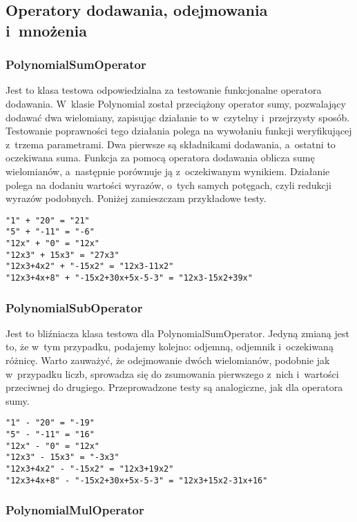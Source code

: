 \subsection{Operatory dodawania, odejmowania i~mnożenia}

\subsubsection{PolynomialSumOperator}

Jest to klasa testowa odpowiedzialna za testowanie funkcjonalne operatora dodawania. W~klasie Polynomial został przeciążony operator sumy, pozwalający dodawać dwa wielomiany, zapisując działanie to w~czytelny i~przejrzysty sposób. Testowanie poprawności tego działania polega na wywołaniu funkcji weryfikującej z~trzema parametrami. Dwa pierwsze są składnikami dodawania, a~ostatni to oczekiwana suma. Funkcja za pomocą operatora dodawania oblicza sumę wielomianów, a~następnie porównuje ją z~oczekiwanym wynikiem. Działanie polega na dodaniu wartości wyrazów, o~tych samych potęgach, czyli redukcji wyrazów podobnych. Poniżej zamieszczam przykładowe testy.

\begin{lstlisting}
"1" + "20" = "21"
"5" + "-11" = "-6"
"12x" + "0" = "12x"
"12x3" + 15x3" = "27x3"
"12x3+4x2" + "-15x2" = "12x3-11x2"
"12x3+4x+8" + "-15x2+30x+5x-5-3" = "12x3-15x2+39x"
\end{lstlisting}

\subsubsection{PolynomialSubOperator}

Jest to bliźniacza klasa testowa dla PolynomialSumOperator. Jedyną zmianą jest to, że w~tym przypadku, podajemy kolejno: odjemną, odjemnik i~oczekiwaną różnicę. Warto zauważyć, że odejmowanie dwóch wielomianów, podobnie jak w~przypadku liczb, sprowadza się do zsumowania pierwszego z~nich i~wartości przeciwnej do drugiego. Przeprowadzone testy są analogiczne, jak dla operatora sumy.

\begin{lstlisting}
"1" - "20" = "-19"
"5" - "-11" = "16"
"12x" - "0" = "12x"
"12x3" - 15x3" = "-3x3"
"12x3+4x2" - "-15x2" = "12x3+19x2"
"12x3+4x+8" - "-15x2+30x+5x-5-3" = "12x3+15x2-31x+16"
\end{lstlisting}

\subsubsection{PolynomialMulOperator}

